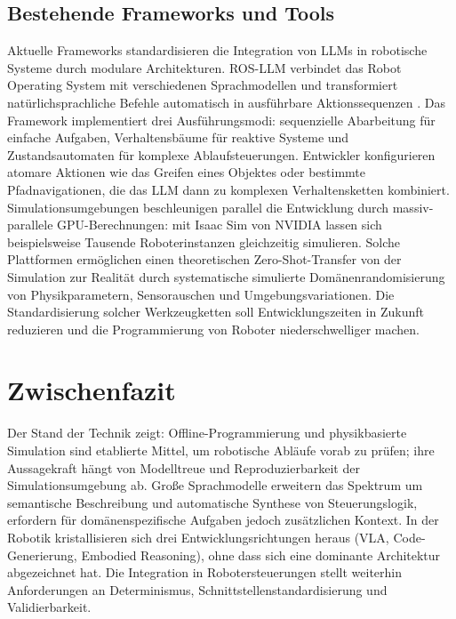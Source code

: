 \subsection{Bestehende Frameworks und Tools}

Aktuelle Frameworks standardisieren die Integration von LLMs in robotische
Systeme durch modulare Architekturen. ROS-LLM verbindet das Robot Operating
System mit verschiedenen Sprachmodellen und transformiert natürlichsprachliche
Befehle automatisch in ausführbare Aktionssequenzen .
Das Framework implementiert drei Ausführungsmodi: sequenzielle Abarbeitung für
einfache Aufgaben, Verhaltensbäume für reaktive Systeme und Zustandsautomaten
für komplexe Ablaufsteuerungen. Entwickler konfigurieren atomare Aktionen wie
das Greifen eines Objektes oder bestimmte Pfadnavigationen, die das LLM dann zu
komplexen Verhaltensketten kombiniert. Simulationsumgebungen beschleunigen
parallel die Entwicklung durch massiv-parallele GPU-Berechnungen: mit Isaac Sim
von NVIDIA lassen sich beispielsweise Tausende Roboterinstanzen gleichzeitig
simulieren. Solche Plattformen
ermöglichen einen theoretischen
Zero-Shot-Transfer von der Simulation zur Realität durch systematische
simulierte Domänenrandomisierung von Physikparametern, Sensorauschen und
Umgebungsvariationen. Die Standardisierung solcher
Werkzeugketten soll Entwicklungszeiten in Zukunft reduzieren und die
Programmierung von
Roboter niederschwelliger machen.

\section*{Zwischenfazit}

Der Stand der Technik zeigt: Offline-Programmierung und physikbasierte
Simulation sind etablierte Mittel, um robotische Abläufe vorab zu prüfen; ihre
Aussagekraft hängt von Modelltreue und Reproduzierbarkeit der
Simulationsumgebung ab. Große Sprachmodelle erweitern das Spektrum um
semantische Beschreibung und automatische Synthese von Steuerungslogik,
erfordern für domänenspezifische Aufgaben jedoch zusätzlichen Kontext. In der
Robotik kristallisieren sich drei Entwicklungsrichtungen heraus (VLA,
Code-Generierung, Embodied Reasoning), ohne dass sich eine dominante Architektur
abgezeichnet hat. Die Integration in Robotersteuerungen stellt weiterhin
Anforderungen an Determinismus, Schnittstellenstandardisierung und
Validierbarkeit.
